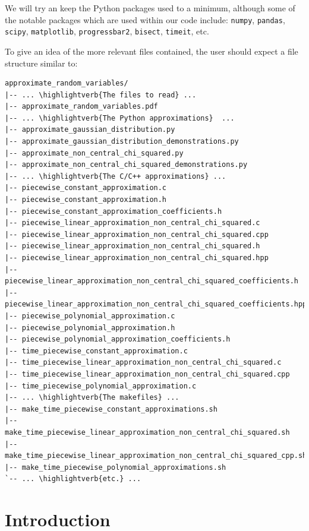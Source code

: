 \documentclass[11pt,a4paper,twoside,english]{extarticle}
\newcommand\highlightverb[1]{\underline{\textbf{#1}}}
\begin{document}
We will try an keep the Python packages used to a minimum, although some of the notable packages which are used within our code include: \texttt{numpy}, \texttt{pandas}, \texttt{scipy}, \texttt{matplotlib}, \texttt{progressbar2}, \texttt{bisect}, \texttt{timeit}, etc. 

To give an idea of the more relevant files contained, the user should expect a file structure similar to:
\begin{lstfloat}[H]
\begin{Verbatim}[commandchars=\\\{\}]
approximate_random_variables/
|-- ... \highlightverb{The files to read} ...
|-- approximate_random_variables.pdf
|-- ... \highlightverb{The Python approximations}  ...
|-- approximate_gaussian_distribution.py
|-- approximate_gaussian_distribution_demonstrations.py
|-- approximate_non_central_chi_squared.py
|-- approximate_non_central_chi_squared_demonstrations.py
|-- ... \highlightverb{The C/C++ approximations} ...
|-- piecewise_constant_approximation.c
|-- piecewise_constant_approximation.h
|-- piecewise_constant_approximation_coefficients.h
|-- piecewise_linear_approximation_non_central_chi_squared.c
|-- piecewise_linear_approximation_non_central_chi_squared.cpp
|-- piecewise_linear_approximation_non_central_chi_squared.h
|-- piecewise_linear_approximation_non_central_chi_squared.hpp
|-- piecewise_linear_approximation_non_central_chi_squared_coefficients.h
|-- piecewise_linear_approximation_non_central_chi_squared_coefficients.hpp
|-- piecewise_polynomial_approximation.c
|-- piecewise_polynomial_approximation.h
|-- piecewise_polynomial_approximation_coefficients.h
|-- time_piecewise_constant_approximation.c
|-- time_piecewise_linear_approximation_non_central_chi_squared.c
|-- time_piecewise_linear_approximation_non_central_chi_squared.cpp
|-- time_piecewise_polynomial_approximation.c
|-- ... \highlightverb{The makefiles} ...
|-- make_time_piecewise_constant_approximations.sh
|-- make_time_piecewise_linear_approximation_non_central_chi_squared.sh
|-- make_time_piecewise_linear_approximation_non_central_chi_squared_cpp.sh
|-- make_time_piecewise_polynomial_approximations.sh
`-- ... \highlightverb{etc.} ...
\end{Verbatim}
\end{lstfloat}

\clearpage
\section{Introduction}
\end{document}
